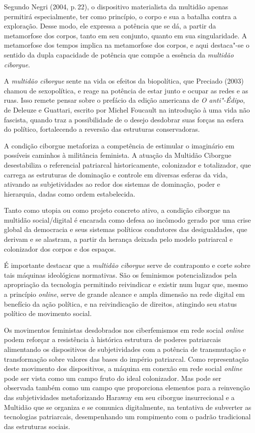 Segundo Negri (2004, p.\,22), o dispositivo materialista da multidão
apenas permitirá especialmente, ter como princípio, o corpo e sua a
batalha contra a exploração. Desse modo, ele expressa a potência que se
dá, a partir da metamorfose dos corpos, tanto em seu conjunto, quanto em
sua singularidade. A metamorfose dos tempos implica na metamorfose dos
corpos, e aqui destaca"-se o sentido da dupla capacidade de potência que
compõe a essência da \textit{multidão ciborgue}.

A \textit{multidão ciborgue} sente na vida os efeitos da biopolítica, que
Preciado (2003) chamou de sexopolítica, e reage na potência de estar
junto e ocupar as redes e as ruas. Isso remete pensar sobre o prefácio
da edição americana de \textit{O anti"-Édipo}, de
Deleuze e Guattari, escrito por Michel Foucault na introdução à uma vida
não fascista, quando traz a possibilidade de o desejo desdobrar suas
forças na esfera do político, fortalecendo a reversão das estruturas
conservadoras.

A condição ciborgue metaforiza a competência de estimular o imaginário
em possíveis caminhos à militância feminista. A atuação da Multidão
Ciborgue desestabiliza o referencial patriarcal historicamente,
colonizador e totalizador, que carrega as estruturas de dominação e
controle em diversas esferas da vida, ativando as subjetividades ao
redor dos sistemas de dominação, poder e hierarquia, dadas como ordem
estabelecida.

Tanto como utopia ou como projeto concreto ativo, a condição ciborgue na
multidão social/digital é encarada como defesa ao incômodo gerado por
uma crise global da democracia e seus sistemas políticos condutores das
desigualdades, que derivam e se alastram, a partir da herança deixada
pelo modelo patriarcal e colonizador dos corpos e dos espaços.

É importante destacar que a \textit{multidão ciborgue} serve de contraponto e
corte sobre tais máquinas ideológicas normativas. São os feminismos
potencializados pela apropriação da tecnologia permitindo reivindicar e
existir num lugar que, mesmo a princípio \textit{online}, serve de grande
alcance e ampla dimensão na rede digital em benefício da ação política,
e na reivindicação de direitos, atingindo seu status político de
movimento social.

Os movimentos feministas desdobrados nos ciberfemismos em rede social
\textit{online} podem reforçar a resistência à histórica estrutura de poderes
patriarcais alimentando os dispositivos de subjetividades com a potência
de transmutação e transformação sobre valores das bases do império
patriarcal. Como representação deste movimento dos dispositivos, a
máquina em conexão em rede social \textit{online} pode ser vista como um campo
fruto do ideal colonizador. Mas pode ser observada também como um campo
que proporciona elementos para a reinvenção das subjetividades
metaforizando Haraway em seu ciborgue insurrecional e a Multidão que se
organiza e se comunica digitalmente, na tentativa de subverter as
tecnologias patriarcais, desempenhando um rompimento com o padrão
tradicional das estruturas sociais.

